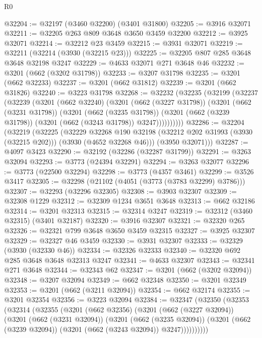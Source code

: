 \begin{lexlean}{R0}
\begin{coremodule}
@32204 := @32197 (@3460 @32200) (@3401 @31800)
@32205 := @3916 @32071
@32211 := @32205 @263 @809 @3648 @3650 @3459 @32200
@32212 := @3925 @32071
@32214 := @32212 @23 @3459
@32215 := @3931 @32071
@32219 := @32211 (@32214 (@3930 (@32215 @23)))
@32225 := @32205 @807 @285 @3648 @3648 @32198 @3247
@32229 := @4633 @32071 @271 @3648 @46
@32232 := @3201 (@662 (@3202 @31798))
@32233 := @3207 @31798
@32235 := @3201 (@662 @32233)
@32237 := @3201 (@662 @31812)
@32239 := @3201 (@662 @31826)
@32240 := @3223 @31798
@32268 := @32232
    (@32235
      (@32199
        (@32237
          (@32239
            (@3201
              (@662 @32240)
              (@3201
                (@662 (@3227 @31798))
                (@3201
                  (@662 (@3231 @31798))
                  (@3201
                    (@662 (@3235 @31798))
                    (@3201 (@662 (@3239 @31798)) (@3201 (@662 (@3243 @31798)) @3247))))))))))
@32286 := @32204
    (@32219
      (@32225
        (@32229
          @32268
          @190
          @32198
          (@32212 @202 @31993 (@3930 (@32215 @202)))
          (@3930 (@4652 @32268 @46)))
        (@3950 @32071)))
@32287 := @4097 @3423
@32290 := @32192 (@32286 (@32287 @31799))
@32291 := @3263 @32094
@32293 := @3773 (@24394 @32291)
@32294 := @3263 @32077
@32296 := @3773 (@22500 @32294)
@32298 := @3773 (@4357 @3461)
@32299 := @3526 @3417
@32305 := @32298 (@21102 (@4051 (@3773 (@3783 @32299) @3786)))
@32307 := @32293 (@32296 @32305)
@32308 := @3903 @32307
@32309 := @32308 @1229
@32312 := @32309 @1234 @3651 @3648
@32313 := @662 @32186
@32314 := @3201 @32313
@32315 := @32314 @3247
@32319 := @32312 (@3460 @32315) (@3401 @32187)
@32320 := @3916 @32307
@32321 := @32320 @265
@32326 := @32321 @799 @3648 @3650 @3459 @32315
@32327 := @3925 @32307
@32329 := @32327 @46 @3459
@32330 := @3931 @32307
@32333 := @32329 (@3930 (@32330 @46))
@32334 := @32326 @32333
@32340 := @32320 @692 @285 @3648 @3648 @32313 @3247
@32341 := @4633 @32307
@32343 := @32341 @271 @3648
@32344 := @32343 @62
@32347 := @3201 (@662 (@3202 @32094))
@32348 := @3207 @32094
@32349 := @662 @32348
@32350 := @3201 @32349
@32353 := @3201 (@662 (@3211 @32094))
@32354 := @662 @32174
@32355 := @3201 @32354
@32356 := @3223 @32094
@32384 := @32347
    (@32350
      (@32353
        (@32314
          (@32355
            (@3201
              (@662 @32356)
              (@3201
                (@662 (@3227 @32094))
                (@3201
                  (@662 (@3231 @32094))
                  (@3201
                    (@662 (@3235 @32094))
                    (@3201 (@662 (@3239 @32094)) (@3201 (@662 (@3243 @32094)) @3247))))))))))

\end{coremodule}
\end{lexlean}
